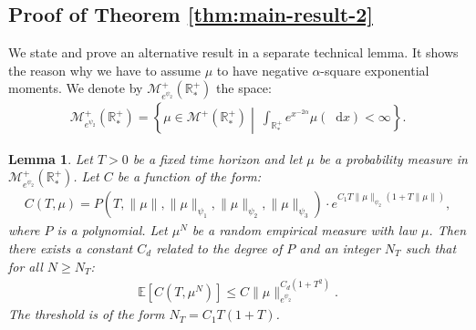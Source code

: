\documentclass[11pt,a4paper]{article}
\newcommand{\RRP}{\mathbb{R}^+_*}
\newcommand{\MC}{\mathcal{M}}
\newcommand{\E}[1]{\mathbb{E}\left[#1\right]}
\newcommand{\dd}{\mathop{}\!\mathrm{d}}
\newtheorem{lemma}[theorem]{Lemma}
\begin{document}
\subsection{Proof of Theorem \ref{thm:main-result-2}}
We state and prove an alternative result in a separate technical lemma. It shows the reason why we have to assume $\mu$ to have negative $\alpha$-square exponential moments. We denote by $\MC^+_{e^{\psi_2}}(\RRP)$ the space:
\begin{align*}
    \MC^+_{e^{\psi_2}}(\RRP) = \left\lbrace \mu \in \MC^+(\RRP) \middle|\ \int_{\RRP} e^{x^{-2\alpha}} \mu(\dd x) < \infty \right\rbrace. 
\end{align*}

\begin{lemma}\label{lem:boudning-constant-empirical}
    Let $T > 0$ be a fixed time horizon and let $\mu$ be a probability measure in $\MC^+_{e^{\psi_2}}(\RRP)$. Let $C$ be a function of the form:
    \begin{align*}
        C(T,\mu) = P(T,\|\mu\|,\|\mu\|_{\psi_1},\|\mu\|_{\psi_2},\|\mu\|_{\psi_3}) \cdot e^{C_1 T\|\mu\|_{\psi_2}(1 + T\|\mu\|)},
    \end{align*}
    where $P$ is a polynomial. Let $\mu^N$ be a random empirical measure with law $\mu$. Then there exists a constant $C_d$ related to the degree of $P$ and an integer $N_T$ such that for all $N \geq N_T$:
    \begin{align*}
        \E{C(T,\mu^N)} \leq C \|\mu\|_{e^{\psi_2}}^{C_d(1 + T^2)}.
    \end{align*}
    The threshold is of the form $N_T = C_1 T(1 + T)$. 
\end{lemma}
\end{document}
